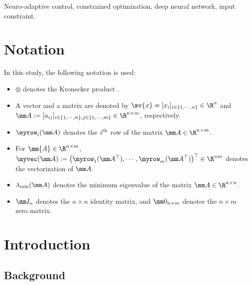 \documentclass[journal]{IEEEtran}
\begin{document}
\begin{IEEEkeywords}
    Neuro-adaptive control, constrained optimization, deep neural network, input constraint.
\end{IEEEkeywords}

\section*{Notation}
In this study, the following notation is used:

\begin{itemize}
    \item $\otimes$ denotes the Kronecker product \cite[Chap. 7 Def. 7.1.2]{Bernstein:2009aa}.
    \item A vector and a matrix are denoted by $\mv{x}=[x_i]_{i\in\{1,\cdots,n\}}\in\R^n$ and $
        \mm A
        := 
        [a_{ij}]
        _{
            i\in\{1,\cdots,n\},j\in\{1,\cdots ,m\}
        }\allowbreak\in\R^{n\times m}
        $, respectively.
    \item $\myrow_i(\mm A)$ denotes the $i\textsuperscript{th}$ row of the matrix $\mm A\in\R^{n\times m}$. 
    \item For $\mm{A}\in\R^{n\times m}$, $\myvec(\mm A):=\left(\myrow_1(\mm A^\top),\cdots,\myrow_m(\mm A^\top)  \right)^\top\in\R^{nm}$ denotes the vectorization of $\mm A$.
    \item $\lambda_{\min}(\mm A)$ denotes the minimum eigenvalue of the matrix $\mm A\in\R^{n\times n}$.
    \item $\mm I_n$ denotes the $n\times n$ identity matrix, and $\mm 0_{n\times m}$ denotes the $n\times m$ zero matrix.
\end{itemize}

\section{Introduction}

\subsection{Background}
\end{document}
